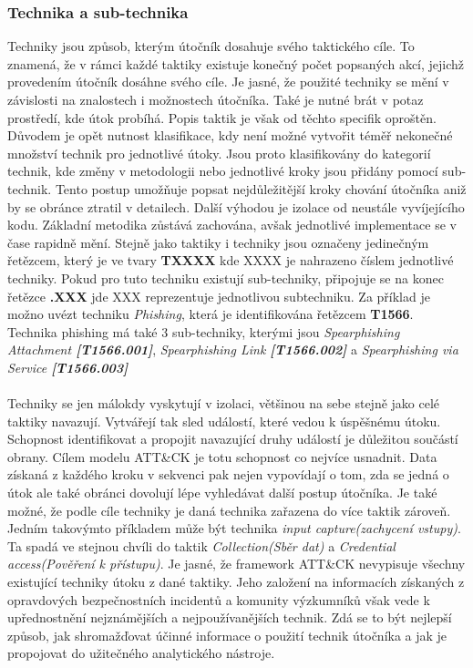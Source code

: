 \subsubsection{Technika a sub-technika}
Techniky jsou způsob, kterým útočník dosahuje svého taktického cíle.
To znamená, že v rámci každé taktiky existuje konečný počet popsaných akcí, jejichž provedením útočník dosáhne svého cíle.
Je jasné, že použité techniky se mění v závislosti na znalostech i možnostech útočníka.
Také je nutné brát v potaz prostředí, kde útok probíhá.
Popis taktik je však od těchto specifik oproštěn.
Důvodem je opět nutnost klasifikace, kdy není možné vytvořit téměř nekonečné množství technik pro jednotlivé útoky.
Jsou proto klasifikovány do kategorií technik, kde změny v metodologii nebo jednotlivé kroky jsou přidány pomocí sub-technik.
Tento postup umožňuje popsat nejdůležitější kroky chování útočníka aniž by se obránce ztratil v detailech.
Další výhodou je izolace od neustále vyvíjejícího kodu.
Základní metodika zůstává zachována, avšak jednotlivé implementace se v čase rapidně mění.
Stejně jako taktiky i techniky jsou označeny jedinečným řetězcem, který je ve tvary \textbf{TXXXX} kde XXXX je nahrazeno číslem jednotlivé techniky.
Pokud pro tuto techniku existují sub-techniky, připojuje se na konec řetězce \textbf{.XXX} jde XXX reprezentuje jednotlivou subtechniku.
Za příklad je možno uvézt techniku \textit{Phishing}, která je identifikována řetězcem \textbf{T1566}.
Technika phishing má také 3 sub-techniky, kterými jsou \textit{Spearphishing Attachment \textbf{[T1566.001]}}, \textit{Spearphishing Link \textbf{[T1566.002]}} a \textit{Spearphishing via Service \textbf{[T1566.003]}}


\paragraph{}
Techniky se jen málokdy vyskytují v izolaci, většinou na sebe stejně jako celé taktiky navazují.
Vytvářejí tak sled událostí, které vedou k úspěšnému útoku.
Schopnost identifikovat a propojit navazující druhy událostí je důležitou součástí obrany.
Cílem modelu ATT\&CK je totu schopnost co nejvíce usnadnit.
Data získaná z každého kroku v sekvenci pak nejen vypovídají o tom, zda se jedná o útok ale také obránci dovolují lépe vyhledávat další postup útočníka.
Je také možné, že podle cíle techniky je daná technika zařazena do více taktik zároveň.
Jedním takovýmto příkladem může být technika \textit{input capture(zachycení vstupy)}.
Ta spadá ve stejnou chvíli do taktik \textit{Collection(Sběr dat)} a \textit{Credential access(Pověření k přístupu)}.
Je jasné, že framework ATT\&CK nevypisuje všechny existující techniky útoku z dané taktiky.
Jeho založení na informacích získaných z opravdových bezpečnostních incidentů a komunity výzkumníků však vede k upřednostnění nejznámějších a nejpoužívanějších technik.
Zdá se to být nejlepší způsob, jak shromažďovat účinné informace o použití technik útočníka a jak je propojovat do užitečného analytického nástroje.\cite{Mitre_finding_cyber_threats, mitre_attack_framework}

